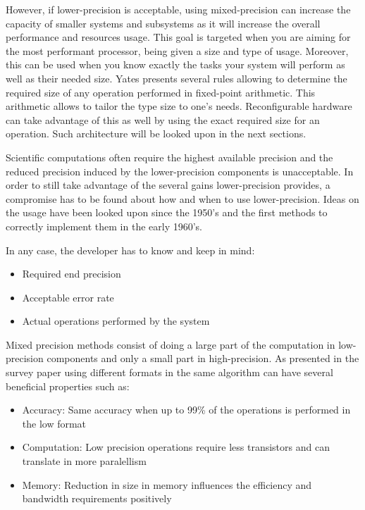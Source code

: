 However, if lower-precision is acceptable, using mixed-precision can increase the capacity of smaller systems and subsystems as it will increase the overall performance and resources usage. This goal is targeted when you are aiming for the most performant processor, being given a size and type of usage. Moreover, this can be used when you know exactly the tasks your system will perform as well as their needed size. Yates \cite{Yates2007} presents several rules allowing  to determine the required size of any operation performed in fixed-point arithmetic. This arithmetic allows to tailor the type size to one's needs. Reconfigurable hardware can take advantage of this as well by using the exact required size for an operation. Such architecture will be looked upon in the next sections.

Scientific computations often require the highest available precision and the reduced precision induced by the lower-precision components is unacceptable. In order to still take advantage of the several gains lower-precision provides, a compromise has to be found about how and when to use lower-precision. Ideas on the usage have been looked upon since the 1950's and the first methods to correctly implement them in the early 1960's.

In any case, the developer has to know and keep in mind:
\begin{itemize}
  \item Required end precision
  \item Acceptable error rate
  \item Actual operations performed by the system
\end{itemize}

Mixed precision methods consist of doing a large part of the computation in low-precision components and only a small part in high-precision. As presented in the survey paper \cite{Goddeke2007} using different formats in the same algorithm can have several beneficial properties such as:
\begin{itemize}
  \item Accuracy: Same accuracy when up to 99\% of the operations is performed in the low format
  \item Computation: Low precision operations require less transistors and can translate in more paralellism
  \item Memory: Reduction in size in memory influences the efficiency and bandwidth requirements positively
\end{itemize}

